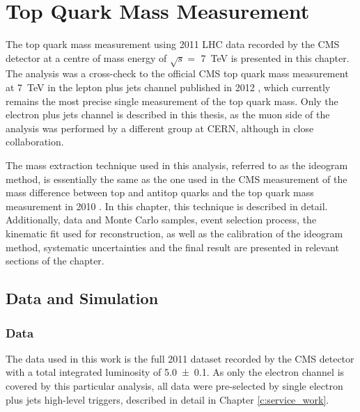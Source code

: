 
\chapter{Top Quark Mass Measurement}
\label{c:top_mass_analysis}
\ifpdf
    \graphicspath{{05_Mass_analysis/plots/}}
\else
    \graphicspath{{05_Mass_analysis/plots/EPS/}{05_Mass_analysis/plots/}}
\fi

The top quark mass measurement using 2011 LHC data recorded by the CMS detector at a centre of mass energy of $\sqrt s
=$ \SI{7}{\TeV} is presented in this chapter. The analysis was a cross-check to the official CMS top quark mass
measurement at \SI{7}{\TeV} in the lepton plus jets channel published in 2012 \autocite{top_mass_ljets_CMS}, which
currently remains the most precise single measurement of the top quark mass. Only the electron plus jets channel is
described in this thesis, as the muon side of the analysis was performed by a different group at CERN, although in close
collaboration.

The mass extraction technique used in this analysis, referred to as the ideogram method, is essentially the same as the
one used in the CMS measurement of the mass difference between top and antitop quarks \autocite{mass_difference_CMS} and
the top quark mass measurement in 2010 \autocite{top_mass_ljets_CMS_2010}. In this chapter, this technique is described
in detail. Additionally, data and Monte Carlo samples, event selection process, the kinematic fit used for \ttbar
reconstruction, as well as the calibration of the ideogram method, systematic uncertainties and the final result are
presented in relevant sections of the chapter.

\section{Data and Simulation}
\label{s_top_mass:data_and_simulation}

\subsection{Data}
\label{ss_top_mass:data}
The data used in this work is the full 2011 dataset recorded by the CMS detector with a total integrated luminosity of
\SI{5.0 \pm 0.1}{\fbinv}. As only the electron channel is covered by this particular analysis, all data were
pre-selected by single electron plus jets high-level triggers, described in detail in Chapter \ref{c:service_work}.

